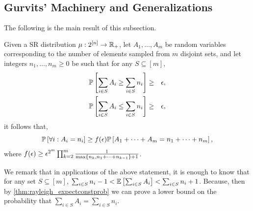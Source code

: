 
\subsection{Gurvits' Machinery and Generalizations}
\label{sec:Gurvits}
The following is the main result of this subsection.
\begin{proposition}\label{lem:427gen}
	Given a SR distribution $\mu:2^{[n]}\to\mathbb{R}_+$, let $A_1,\dots,A_m$ be random variables corresponding to the number of elements sampled from $m$ disjoint sets, and let integers  $n_1,\dots,n_m\geq 0$ be such that for any $S\subseteq [m]$,
	\begin{eqnarray*}
		 {\mathbb{P}}\left[\sum_{i\in S} A_i \geq \sum_{i\in S} n_i\right] &\geq & {\epsilon},\\
		 {\mathbb{P}}\left[\sum_{i\in S} A_i \leq \sum_{i\in S} n_i\right] &\geq & {\epsilon},\\
	\end{eqnarray*}
	it follows that,
	$$ {\mathbb{P}}\left[\forall i: A_i=n_i\right] \geq f({\epsilon}){\mathbb{P}}\left[A_1+\dots+A_m=n_1+\dots+n_m\right],$$
	where $f({\epsilon})\geq {\epsilon}^{2^m}\prod_{k=2}^m \frac1{\max\{n_k, n_1+\dots+n_{k-1}\}+1}$. 
\end{proposition}
We remark that in  applications of the above statement, it is enough to know that for any set $S\subseteq [m]$, $\sum_{i\in S} n_i-1 < {\mathbb{E}}\left[\sum_{i\in S} A_i\right]<\sum_{i\in S} n_i+1$. Because, then by \cref{thm:rayleigh_expectconstprob} we can prove a lower bound on the probability that $\sum_{i\in S} A_i = \sum_{i\in S} n_i$. 

